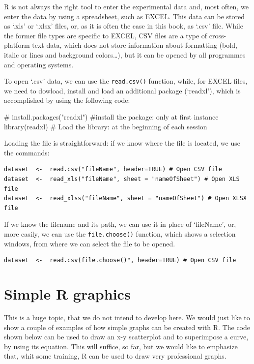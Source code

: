 \documentclass[a4paper,12pt,oneside]{book}
\newenvironment{Shaded}{\begin{snugshade}}{\end{snugshade}}
\newcommand{\CommentTok}[1]{#1}
\newcommand{\FunctionTok}[1]{#1}
\newcommand{\NormalTok}[1]{#1}
\begin{document}
R is not always the right tool to enter the experimental data and, most often, we enter the data by using a spreadsheet, such as EXCEL. This data can be stored as `.xls' or `.xlsx' files, or, as it is often the case in this book, as `.csv' file. While the former file types are specific to EXCEL, CSV files are a type of cross-platform text data, which does not store information about formatting (bold, italic or lines and background colors\ldots), but it can be opened by all programmes and operating systems.

To open `.csv' data, we can use the \texttt{read.csv()} function, while, for EXCEL files, we need to dowload, install and load an additional package (`readxl'), which is accomplished by using the following code:

\begin{Shaded}
\begin{Highlighting}[]
\CommentTok{\# install.packages("readxl") \#install the package: only at first instance}
\FunctionTok{library}\NormalTok{(readxl) }\CommentTok{\# Load the library: at the beginning of each session}
\end{Highlighting}
\end{Shaded}

Loading the file is straightforward: if we know where the file is located, we use the commands:

\begin{verbatim}
dataset  <-  read.csv("fileName", header=TRUE) # Open CSV file
dataset  <-  read_xls("fileName", sheet = "nameOfSheet") # Open XLS file
dataset  <-  read_xlss("fileName", sheet = "nameOfSheet") # Open XLSX file
\end{verbatim}

If we know the filename and its path, we can use it in place of `fileName', or, more easily, we can use the \texttt{file.choose()} function, which shows a selection windows, from where we can select the file to be opened.

\begin{verbatim}
dataset  <-  read.csv(file.choose()", header=TRUE) # Open CSV file
\end{verbatim}

\hypertarget{simple-r-graphics}{%
\section{Simple R graphics}\label{simple-r-graphics}}

This is a huge topic, that we do not intend to develop here. We would just like to show a couple of examples of how simple graphs can be created with R. The code shown below can be used to draw an x-y scatterplot and to superimpose a curve, by using its equation. This will suffice, so far, but we would like to emphasize that, whit some training, R can be used to draw very professional graphs.
\end{document}
